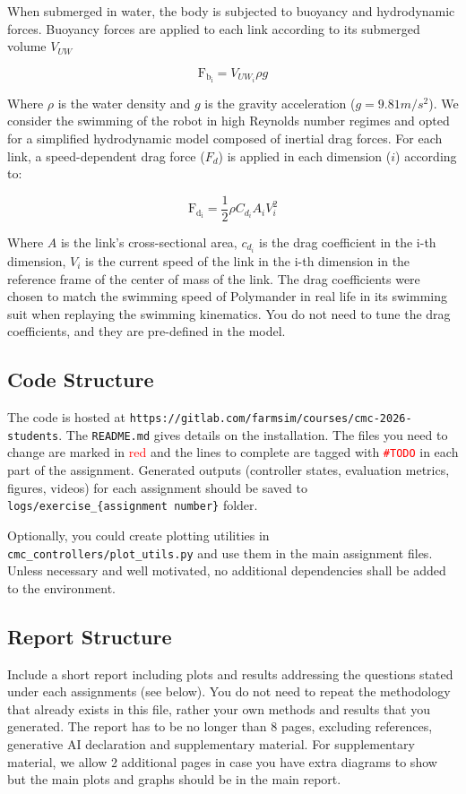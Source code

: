 \documentclass{cmc}
\begin{document}
When submerged in water, the body is subjected to buoyancy and hydrodynamic forces. Buoyancy forces are applied to each link according to its submerged volume $V_{UW}$

  \[
	\mathrm{F_{b_i}} = V_{UW_i} \rho g
  \]

Where $\rho$ is the water density and $g$ is the gravity acceleration ($g = 9.81 m/s^2$).
We consider the swimming of the robot in high Reynolds number regimes and opted for a simplified hydrodynamic model composed of inertial drag forces. For each link, a speed-dependent drag force ($F_d$) is applied in each dimension ($i$) according to:

  \[
	\mathrm{F_{d_i}} = \frac{1}{2} \rho C_{d_i} A_{i} V_{i}^2
  \]

Where $A$ is the link's cross-sectional area, $c_{d_i}$ is the drag coefficient in the i-th dimension, $V_{i}$ is the current speed of the link in the i-th dimension in the reference frame of the center of mass of the link. The drag coefficients were chosen to match the swimming speed of Polymander in real life in its swimming suit when replaying the swimming kinematics. You do not need to tune the drag coefficients, and they are pre-defined in the model.


\subsection{Code Structure}
The code is hosted at \texttt{https://gitlab.com/farmsim/courses/cmc-2026-students}. The \texttt{README.md} gives details on the installation. The files you need to change are marked in \textcolor{red}{red} and the lines to complete are tagged with \textcolor{red}{\texttt{\#TODO}} in each part of the assignment. Generated outputs (controller states, evaluation metrics, figures, videos) for each assignment should be saved to \texttt{logs/exercise\_\{assignment number\}} folder.

Optionally, you could create plotting utilities in \texttt{cmc\_controllers/plot\_utils.py} and use them in the main assignment files. Unless necessary and well motivated, no additional dependencies shall be added to the environment.

\subsection{Report Structure}

Include a short report including plots and results addressing the questions stated under each assignments (see below). You do not need to repeat the methodology that already exists in this file, rather your own methods and results that you generated. The report has to be no longer than 8 pages, excluding references, generative AI declaration and supplementary material. For supplementary material, we allow 2 additional pages in case you have extra diagrams to show but the main plots and graphs should be in the main report.
\end{document}
